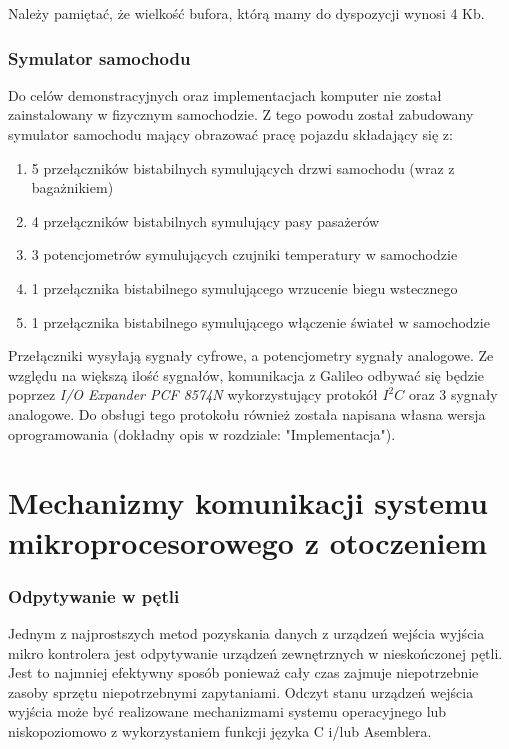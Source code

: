 \documentclass{xmgr}
\begin{document}
Należy pamiętać, że wielkość bufora, którą mamy do dyspozycji wynosi 4 Kb. 

\subsection{Symulator samochodu}
Do celów demonstracyjnych oraz implementacjach komputer nie został zainstalowany w fizycznym samochodzie. Z tego powodu został zabudowany symulator samochodu mający obrazować pracę pojazdu składający się z:
\begin{enumerate}
	\item 5 przełączników bistabilnych symulujących drzwi samochodu (wraz z bagażnikiem)
	\item 4 przełączników bistabilnych symulujący pasy pasażerów
	\item 3 potencjometrów symulujących czujniki temperatury w samochodzie
	\item 1 przełącznika bistabilnego symulującego wrzucenie biegu wstecznego
	\item 1 przełącznika bistabilnego symulującego włączenie świateł w samochodzie
\end{enumerate}

Przełączniki wysyłają sygnały cyfrowe, a potencjometry sygnały analogowe. Ze względu na większą ilość sygnałów, komunikacja z Galileo odbywać się będzie poprzez \emph{I/O Expander PCF 8574N} wykorzystujący protokół  $I^2C$ oraz 3 sygnały analogowe. Do obsługi tego protokołu również została napisana własna wersja oprogramowania (dokładny opis w rozdziale: "Implementacja").



\chapter{Mechanizmy komunikacji systemu mikroprocesorowego z otoczeniem}
\subsection{Odpytywanie w pętli}
Jednym z najprostszych metod pozyskania danych z urządzeń wejścia wyjścia mikro kontrolera jest odpytywanie urządzeń zewnętrznych w nieskończonej pętli. Jest to najmniej efektywny sposób ponieważ cały czas zajmuje niepotrzebnie zasoby sprzętu niepotrzebnymi zapytaniami. Odczyt stanu urządzeń wejścia wyjścia może być realizowane mechanizmami systemu operacyjnego lub niskopoziomowo z wykorzystaniem funkcji języka C i/lub Asemblera.
\end{document}
